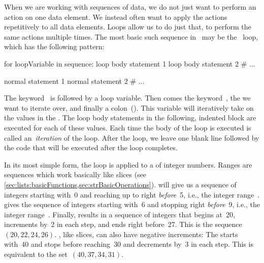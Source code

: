 %
%
When we are working with sequences of data, we do not just want to perform an action on one data element.
We instead often want to apply the actions repetitively to all data elements.
Loops allow us to do just that, to perform the same actions multiple times.%
%
%
%
%
%
The most basic such sequence in \python\ may be the ~loop, which has the following pattern:%
%
\begin{pythonSyntax}
for loopVariable in sequence:
    loop body statement 1
    loop body statement 2
    # ...

normal statement 1
normal statement 2
# ...
\end{pythonSyntax}
%
%
%
%
%
%
The keyword~ is followed by a loop variable.
Then comes the keyword~, the  we want to iterate over, and finally a colon~(\pythonilIdx{:}).
This variable will iteratively take on the values in the .
The loop body statements in the following, indented block are executed for each of these values.
Each time the body of the loop is executed is called an~\emph{iteration} of the loop.
After the loop, we leave one blank line followed by the code that will be executed after the loop completes.

In its most simple form, the  loop is applied to a  of integer numbers.
Ranges are sequences which work basically like slices (see \cref{sec:lists:basicFunctions,sec:strBasicOperations}).
 will give us a sequence of integers starting with~0 and reaching up to right \emph{before}~5, i.e., the integer range~.
 gives the sequence of integers starting with~6 and stopping right \emph{before}~9, i.e., the integer range~.
Finally,  results in a sequence of integers that begins at~20, increments by~2 in each step, and ends right before~27.
This is the sequence~$(20, 22, 24, 26)$.
, like slices, can also have negative increments:
The  starts with~40 and stops before reaching~30 and decrements by~3 in each step.
This is equivalent to the set~$(40, 37, 34, 31)$.

